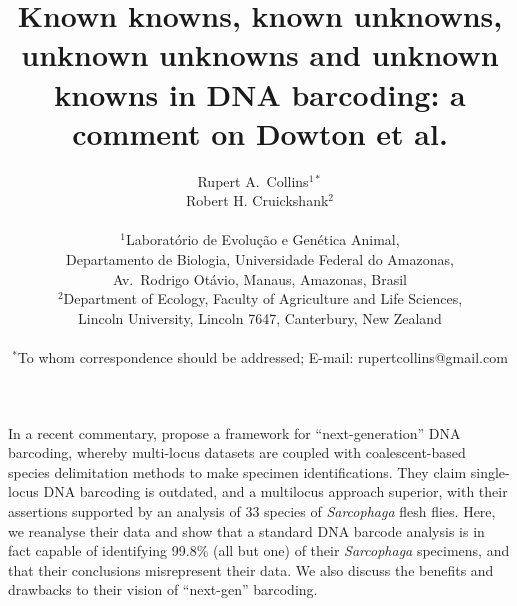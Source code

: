\documentclass[12pt]{article}
\title{\bf Known knowns, known unknowns, unknown unknowns and unknown knowns in DNA barcoding: a comment on Dowton et al.}
\author
{Rupert A.\ Collins$^{1*}$\\
Robert H. Cruickshank$^{2}$\\
\\
\normalsize{$^{1}$Laborat\'orio de Evolu\c c\~ao e Gen\'etica Animal,}\\
\normalsize{Departamento de Biologia, Universidade Federal do Amazonas,}\\
\normalsize{Av.\ Rodrigo Ot\'avio, Manaus, Amazonas, Brasil}\\
\normalsize{$^{2}$Department of Ecology, Faculty of Agriculture and Life Sciences,}\\
\normalsize{Lincoln University,  Lincoln 7647,  Canterbury, New Zealand}\\
\\
\normalsize{$^\ast$To whom correspondence should be addressed; E-mail:  rupertcollins@gmail.com}
}
\date{}
\newenvironment{sciabstract}{%
\begin{quote} }
{\end{quote}}
\begin{document}
 
\maketitle 



%
%
%
%
%

In a recent commentary, \citet{Dowton2014} propose a framework for ``next-generation'' DNA barcoding, whereby multi-locus datasets are coupled with coalescent-based species delimitation methods to make specimen identifications. They claim single-locus DNA barcoding is outdated, and a multilocus approach superior, with their assertions supported by an analysis of 33 species of \emph{Sarcophaga} flesh flies. Here, we reanalyse their data and show that a standard DNA barcode analysis is in fact capable of identifying 99.8\% (all but one) of their \emph{Sarcophaga} specimens, and that their conclusions misrepresent their data. We also discuss the benefits and drawbacks to their vision of ``next-gen'' barcoding.
\end{document}
